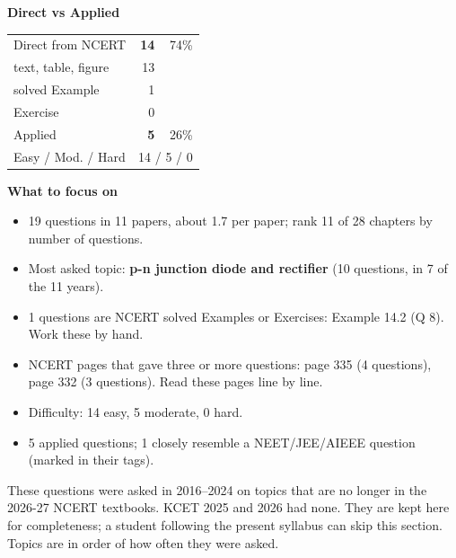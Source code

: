 \begin{minipage}[t]{0.34\linewidth}{\small\textbf{\color{crimson}Direct vs Applied}\par\smallskip
\begin{tabular}{@{}lrr@{}}\toprule
Direct from NCERT & \textbf{14} & 74\%\\
\quad text, table, figure & 13 &\\
\quad solved Example & 1 &\\
\quad Exercise & 0 &\\
Applied & \textbf{5} & 26\%\\\midrule
Easy / Mod. / Hard & \multicolumn{2}{r}{14 / 5 / 0}\\\bottomrule
\end{tabular}}\end{minipage}\hfill
\begin{minipage}[t]{0.63\linewidth}{\small\textbf{\color{crimson}What to focus on}\par\smallskip
\begin{itemize}[leftmargin=1.1em,itemsep=1pt,topsep=0pt]
\item 19 questions in 11 papers, about 1.7 per paper; rank 11 of 28 chapters by number of questions.
\item Most asked topic: \textbf{p-n junction diode and rectifier} (10 questions, in 7 of the 11 years).
\item 1 questions are NCERT solved Examples or Exercises: Example 14.2 (Q 8). Work these by hand.
\item NCERT pages that gave three or more questions: page 335 (4 questions), page 332 (3 questions). Read these pages line by line.
\item Difficulty: 14 easy, 5 moderate, 0 hard.
\item 5 applied questions; 1 closely resemble a NEET/JEE/AIEEE question (marked in their tags).
\end{itemize}}\end{minipage}\par
{}
{\small These questions were asked in 2016--2024 on topics that are no longer in the 2026-27 NCERT textbooks. KCET 2025 and 2026 had none. They are kept here for completeness; a student following the present syllabus can skip this section. Topics are in order of how often they were asked.}\par\medskip
